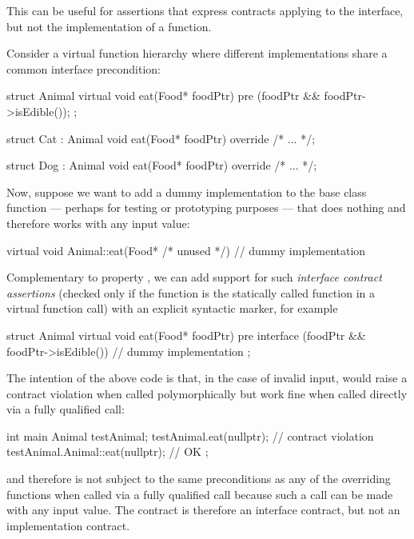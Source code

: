 This can be useful for assertions that express contracts applying to the interface, but not the implementation of a function.

Consider a virtual function hierarchy where different implementations share a common interface
precondition:

\begin{codeblock}
struct Animal {
  virtual void eat(Food* foodPtr)
    pre (foodPtr && foodPtr->isEdible());
};

struct Cat : Animal {
  void eat(Food* foodPtr) override
    /* ... */;
}

struct Dog : Animal {
  void eat(Food* foodPtr) override
    /* ... */;
}
\end{codeblock}

Now, suppose we want to add a dummy implementation to the base class function  --- perhaps for testing or prototyping purposes --- that does nothing and therefore works with any input value:

\begin{codeblock}
virtual void Animal::eat(Food* /* unused */) {
  // dummy implementation
}
\end{codeblock}

Complementary to property , we can add support for such \emph{interface contract assertions} (checked only if the function is the statically called function in a virtual function call) with an explicit syntactic marker, for example

\begin{codeblock}
struct Animal {
  virtual void eat(Food* foodPtr)
    pre interface (foodPtr && foodPtr->isEdible()) {
      // dummy implementation
    }
};
\end{codeblock}

The intention of the above code is that, in the case of invalid input,  would raise a contract violation when called polymorphically but work fine when called directly via a fully qualified call:
\begin{codeblock}
int main {
  Animal testAnimal;
  testAnimal.eat(nullptr);  // contract violation
  testAnimal.Animal::eat(nullptr); // OK
};
\end{codeblock}

 and therefore is not subject to the same
preconditions as any of the overriding functions when called via a fully qualified call because such a
call can be made with any input value. The contract is therefore an interface contract, but not an
implementation contract.

